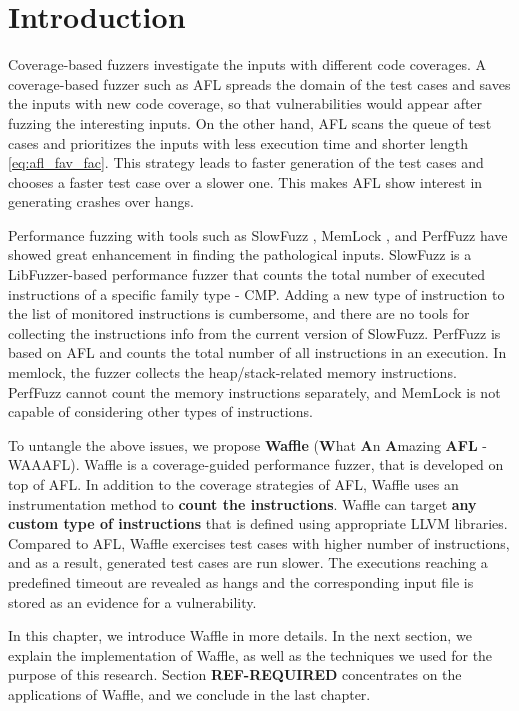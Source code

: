\section{Introduction}

Coverage-based fuzzers investigate the inputs with different code coverages. A coverage-based fuzzer such as AFL spreads the domain of the test cases and saves the inputs with new code coverage, so that vulnerabilities would appear after fuzzing the interesting inputs. On the other hand, AFL scans the queue of test cases and prioritizes the inputs with less execution time and shorter length \ref{eq:afl_fav_fac}. This strategy leads to faster generation of the test cases and chooses a faster test case over a slower one. This makes AFL show interest in generating crashes over hangs.

Performance fuzzing with tools such as SlowFuzz \cite{petsios2017slowfuzz}, MemLock \cite{wen2020memlock}, and PerfFuzz \cite{lemieux2018perffuzz} have showed great enhancement in finding the pathological inputs. SlowFuzz is a LibFuzzer-based performance fuzzer that counts the total number of executed instructions of a specific family type - CMP. Adding a new type of instruction to the list of monitored instructions is cumbersome, and there are no tools for collecting the instructions info from the current version of SlowFuzz. PerfFuzz is based on AFL and counts the total number of all instructions in an execution. In memlock, the fuzzer collects the heap/stack-related memory instructions. PerfFuzz cannot count the memory instructions separately, and MemLock is not capable of considering other types of instructions.

To untangle the above issues, we propose \textbf{Waffle} (\textbf{W}hat \textbf{A}n \textbf{A}mazing \textbf{AFL} - WAAAFL). Waffle is a coverage-guided performance fuzzer, that is developed on top of AFL. In addition to the coverage strategies of AFL, Waffle uses an instrumentation method to \textbf{count the instructions}. Waffle can target \textbf{any custom type of instructions} that is defined using appropriate LLVM libraries. Compared to AFL, Waffle exercises test cases with higher number of instructions, and as a result, generated test cases are run slower. The executions reaching a predefined timeout are revealed as hangs and the corresponding input file is stored as an evidence for a vulnerability.

In this chapter, we introduce Waffle in more details. In the next section, we explain the implementation of Waffle, as well as the techniques we used for the purpose of this research. Section \textbf{REF-REQUIRED} concentrates on the applications of Waffle, and we conclude in the last chapter.



